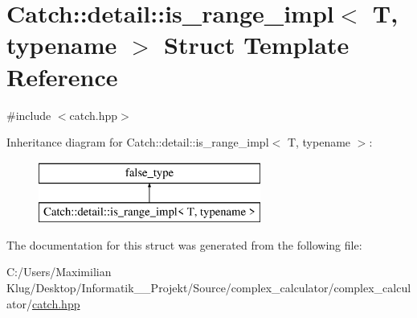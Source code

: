 \hypertarget{struct_catch_1_1detail_1_1is__range__impl}{}\section{Catch\+:\+:detail\+:\+:is\+\_\+range\+\_\+impl$<$ T, typename $>$ Struct Template Reference}
\label{struct_catch_1_1detail_1_1is__range__impl}


{\ttfamily \#include $<$catch.\+hpp$>$}

Inheritance diagram for Catch\+:\+:detail\+:\+:is\+\_\+range\+\_\+impl$<$ T, typename $>$\+:\begin{figure}[H]
\begin{center}
\leavevmode
\includegraphics[height=2.000000cm]{struct_catch_1_1detail_1_1is__range__impl}
\end{center}
\end{figure}


The documentation for this struct was generated from the following file\+:\begin{DoxyCompactItemize}
\item 
C\+:/\+Users/\+Maximilian Klug/\+Desktop/\+Informatik\+\_\+\_\+\+Projekt/\+Source/complex\+\_\+calculator/complex\+\_\+calculator/\mbox{\hyperlink{catch_8hpp}{catch.\+hpp}}\end{DoxyCompactItemize}
